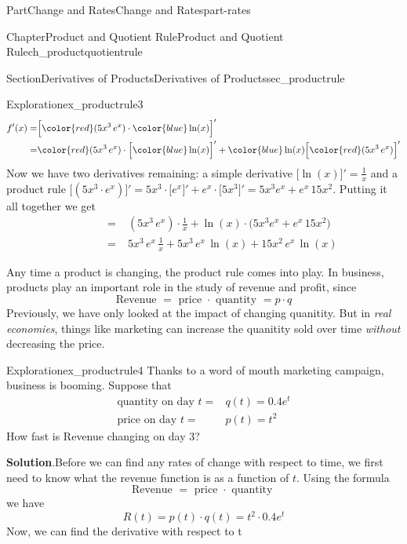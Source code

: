 \documentclass[oneside,10pt,]{tufte-book}
\newcommand{\blocktitlefont}{\relax}
\numberwithin{equation}{chapter}
\newcommand{\red}[1]{   {\color{red}   #1}   }
\newcommand{\blue}[1]{  {\color{blue}  #1}  }
\newcommand{\D}[1]{ \Big[ #1 \Big]'  }
\newcommand{\amp}{&}
\begin{document}
\begin{partptx}{Part}{Change and Rates}{}{Change and Rates}{}{}{part-rates}
\begin{chapterptx}{Chapter}{Product and Quotient Rule}{}{Product and Quotient Rule}{}{}{ch_productquotientrule}
\begin{sectionptx}{Section}{Derivatives of Products}{}{Derivatives of Products}{}{}{sec_productrule}
\begin{exploration}{Exploration}{}{ex_productrule3}
\begin{align*}
f'(x) = \amp \D{\red{(5x^3\, e^x)}\cdot \blue{\ln(x)}}  \\
= \amp \red{(5x^3\, e^x)}\cdot \D{\blue{\ln(x)}}  +  \blue{\ln(x)}\D{\red{(5x^3\, e^x)} } 
\end{align*}
Now we have two derivatives remaining: a simple derivative \(\D{{\ln(x)}} = \frac{1}{x}\) and a product rule \(\D{{(5x^3\cdot e^x)} } = 5x^3 \cdot \D{e^x} + e^x\cdot \D{5x^3} = 5x^3 e^x + e^x\, 15x^2\).  Putting it all together we get%
\begin{align*}
\phantom{f'(x)} = \amp {(5x^3\, e^x)}\cdot \frac{1}{x}  +  {\ln(x)}\cdot \Big( 5x^3 e^x + e^x\, 15x^2 \Big) \\
\phantom{f'(x)} = \amp 5x^3\, e^x \,\frac{1}{x}  +   5x^3\, e^x\, \ln(x) + 15x^2\,e^x\,  \ln(x) 
\end{align*}
%
\end{exploration}%
Any time a product is changing, the product rule comes into play. In business, products play an important role in the study of revenue and profit, since%
\begin{equation*}
\text{Revenue } = \text{ price }\cdot \text{ quantity } = p\cdot q
\end{equation*}
Previously, we have only looked at the impact of changing quanitity. But in \emph{real economies}, things like marketing can increase the quanitity sold over time \emph{without} decreasing the price.%
\begin{exploration}{Exploration}{}{ex_productrule4}%
Thanks to a word of mouth marketing campaign, business is booming.  Suppose that%
\begin{align*}
\text{quantity on day }t =\amp q(t) = 0.4e^t \\
\text{price on day }t =\amp p(t) = t^2   
\end{align*}
How fast is Revenue changing on day 3?%
\par\smallskip%
\noindent\textbf{\blocktitlefont Solution}.\hypertarget{ex_productrule4-2}{}\quad{}Before we can find any rates of change with respect to time, we first need to know what the revenue function is as a function of \(t\).  Using the formula%
\begin{equation*}
\text{Revenue } = \text{ price }\cdot \text{ quantity }
\end{equation*}
we have%
\begin{equation*}
R(t) = p(t) \cdot q(t) = t^2\cdot 0.4e^t
\end{equation*}
Now, we can find the derivative with respect to t%
\begin{align*}

\end{align*}
\end{exploration}
\end{sectionptx}
\end{chapterptx}
\end{partptx}
\end{document}
